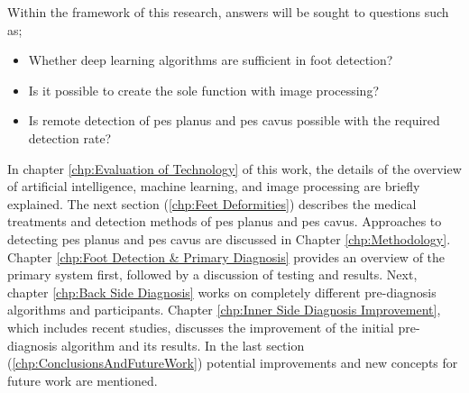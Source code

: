 Within the framework of this research, answers will be sought to questions such as;

\begin{itemize}
  \item Whether deep learning algorithms are sufficient in foot detection?
  \item Is it possible to create the sole function with image processing?
  \item Is remote detection of pes planus and pes cavus possible with the required detection rate?
\end{itemize}

In chapter \ref{chp:Evaluation of Technology} of this work, the details of the overview of artificial intelligence, machine learning, and image processing are briefly explained. The next section (\ref{chp:Feet Deformities}) describes the medical treatments and detection methods of pes planus and pes cavus. Approaches to detecting pes planus and pes cavus are discussed in Chapter \ref{chp:Methodology}. Chapter \ref{chp:Foot Detection & Primary Diagnosis} provides an overview of the primary system first, followed by a discussion of testing and results. Next, chapter \ref{chp:Back Side Diagnosis} works on completely different pre-diagnosis algorithms and participants. Chapter \ref{chp:Inner Side Diagnosis Improvement}, which includes recent studies, discusses the improvement of the initial pre-diagnosis algorithm and its results. In the last section (\ref{chp:ConclusionsAndFutureWork}) potential improvements and new concepts for future work are mentioned.
